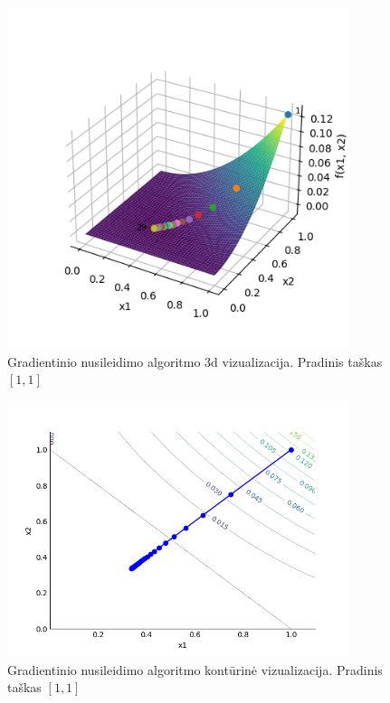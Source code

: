 \documentclass{VUMIFPSkursinis}
\begin{document}
\begin{figure}[H]
  \centering
  \includegraphics[width=10cm]{img/gradient_descent_3d_[1.0,1.0].png}
  \caption{Gradientinio nusileidimo algoritmo 3d vizualizacija. Pradinis taškas $[1, 1]$}
  \label{img:grad-des-3d-11}
\end{figure}

\begin{figure}[H]
  \centering
  \includegraphics[width=10cm]{img/gradient_descent_contour_[1.0,1.0].png}
  \caption{Gradientinio nusileidimo algoritmo kontūrinė vizualizacija. Pradinis taškas $[1, 1]$}
  \label{img:grad-des-co-11}
\end{figure}
\end{document}
